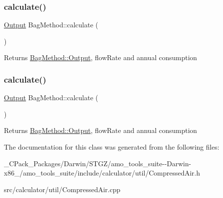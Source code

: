 \subsubsection{\texorpdfstring{calculate()}{calculate()}\hspace{0.1cm}{\footnotesize\ttfamily [2/3]}}
{\footnotesize\ttfamily \hyperlink{struct_bag_method_1_1_output}{Output} Bag\+Method\+::calculate (\begin{DoxyParamCaption}{ }\end{DoxyParamCaption})}

\begin{DoxyReturn}{Returns}
\hyperlink{struct_bag_method_1_1_output}{Bag\+Method\+::\+Output}, flow\+Rate and annual consumption 
\end{DoxyReturn}
\mbox{\label{class_bag_method_afe5b5d6bf23f8af18ad0c75edac1eb4d}} 
\subsubsection{\texorpdfstring{calculate()}{calculate()}\hspace{0.1cm}{\footnotesize\ttfamily [3/3]}}
{\footnotesize\ttfamily \hyperlink{struct_bag_method_1_1_output}{Output} Bag\+Method\+::calculate (\begin{DoxyParamCaption}{ }\end{DoxyParamCaption})}

\begin{DoxyReturn}{Returns}
\hyperlink{struct_bag_method_1_1_output}{Bag\+Method\+::\+Output}, flow\+Rate and annual consumption 
\end{DoxyReturn}


The documentation for this class was generated from the following files\+:\begin{DoxyCompactItemize}
\item 
\+\_\+\+C\+Pack\+\_\+\+Packages/\+Darwin/\+S\+T\+G\+Z/amo\+\_\+tools\+\_\+suite-\/-\/\+Darwin-\/x86\+\_/amo\+\_\+tools\+\_\+suite/include/calculator/util/Compressed\+Air.\+h\item 
src/calculator/util/Compressed\+Air.\+cpp\end{DoxyCompactItemize}
